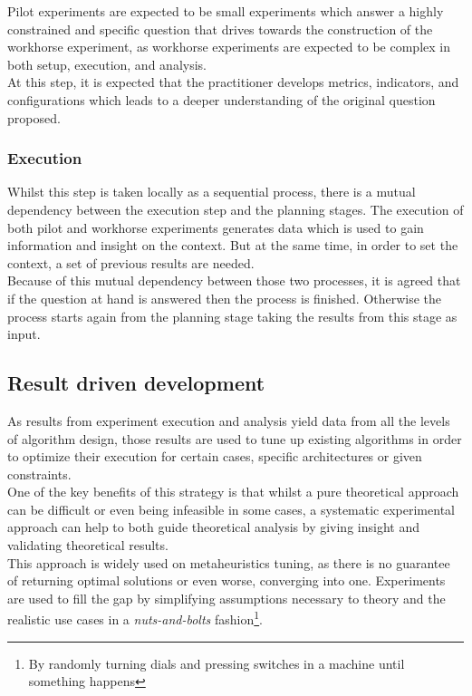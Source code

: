 Pilot experiments are expected to be small experiments which answer a highly constrained and specific question that drives towards the construction of the workhorse experiment, as workhorse experiments are expected to be complex in both setup, execution, and analysis.\\

At this step, it is expected that the practitioner develops metrics, indicators, and configurations which leads to a deeper understanding of the original question proposed.\\

\subsubsection{Execution}
Whilst this step is taken locally as a sequential process, there is a mutual dependency between the execution step and the planning stages. The execution of both pilot and workhorse experiments generates data which is used to gain information and insight on the context. But at the same time, in order to set the context, a set of previous results are needed. \\

Because of this mutual dependency between those two processes, it is agreed that if the question at hand is answered then the process is finished. Otherwise the process starts again from the planning stage taking the results from this stage as input.\\

\subsection{Result driven development}
As results from experiment execution and analysis yield data from all the levels of algorithm design, those results are used to tune up existing algorithms in order to optimize their execution for certain cases, specific architectures or given constraints.\\

One of the key benefits of this strategy is that whilst a pure theoretical approach can be difficult or even being infeasible in some cases, a systematic experimental approach can help to both guide theoretical analysis by giving insight and validating theoretical results.\\

This approach is widely used on metaheuristics tuning, as there is no guarantee of returning optimal solutions or even worse, converging into one. Experiments are used to fill the gap by simplifying assumptions necessary to theory and the realistic use cases in a \emph{nuts-and-bolts} fashion\footnote{By randomly turning dials and pressing switches in a machine until something happens}. \\

